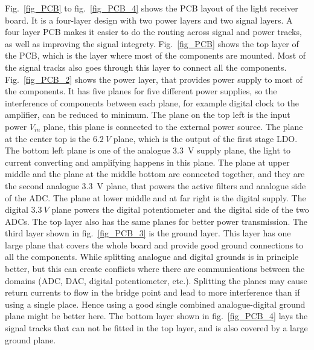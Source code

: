 Fig.~\ref{fig_PCB} to fig.~\ref{fig_PCB_4} shows the PCB layout of the light receiver board.  It is a four-layer design with two power layers and two signal layers.  A four layer PCB makes it easier to do the routing across signal and power tracks, as well as improving the signal integrety.  Fig.~\ref{fig_PCB} shows the top layer of the PCB, which is the layer where most of the components are mounted.  Most of the signal tracks also goes through this layer to connect all the components.  Fig.~\ref{fig_PCB_2} shows the power layer, that provides power supply to most of the components.  It has five planes for five different power supplies, so the interference of components between each plane, for example digital clock to the amplifier, can be reduced to minimum.  The plane on the top left is the input power $V_{in}$ plane, this plane is connected to the external power source.  The plane at the center top is the $\qty{6.2}{V}$ plane, which is the output of the first stage LDO.  The bottom left plane is one of the analogue \qty{3.3}{V} supply plane, the light to current converting and amplifying happens in this plane. The plane at upper middle and the plane at the middle bottom are connected together, and they are the second analogue \qty{3.3}{V} plane, that powers the active filters and analogue side of the ADC.  The plane at lower middle and at far right is the digital supply.  The digital $\qty{3.3}{V}$ plane powers the digital potentiometer and the digital side of the two ADCs.  The top layer also has the same planes for better power transmission.  The third layer shown in fig.~\ref{fig_PCB_3} is the ground layer.  This layer has one large plane that covers the whole board and provide good ground connections to all the components.  While splitting analogue and digital grounds is in principle better, but this can create conflicts where there are communications between the domains (ADC, DAC, digital potentiometer, etc.).  Splitting the planes may cause return currents to flow in the bridge point and lead to more interference than if using a single place.  Hence using a good single combined analogue-digital ground plane might be better here.  The bottom layer shown in fig.~\ref{fig_PCB_4} lays the signal tracks that can not be fitted in the top layer, and is also covered by a large ground plane.

